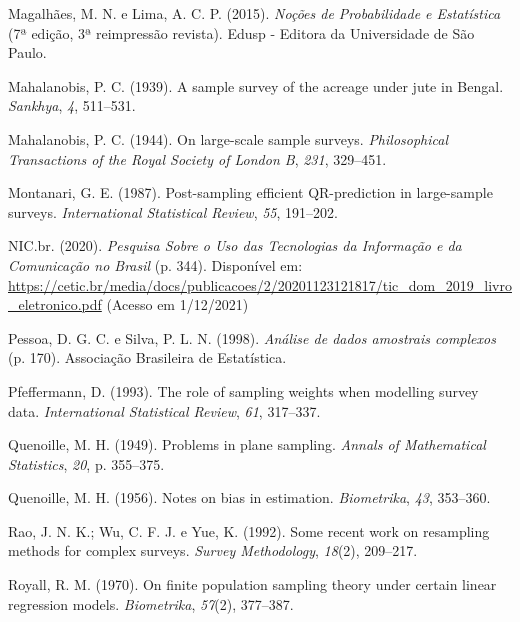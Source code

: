 \documentclass[
  12pt,
  brazilian,
]{book}
\newlength{\cslhangindent}
\newlength{\cslentryspacingunit} %
\newenvironment{CSLReferences}[2] %
 {%
  \setlength{\parindent}{0pt}
  \ifodd #1
  \let\oldpar\par
  \def\par{\hangindent=\cslhangindent\oldpar}
  \fi
  \setlength{\parskip}{#2\cslentryspacingunit}
 }%
 {}
\theoremstyle{definition}
\theoremstyle{definition}
\theoremstyle{definition}
\theoremstyle{definition}
\theoremstyle{remark}
\begin{document}
\begin{CSLReferences}{1}{0}
\leavevmode{}%
Magalhães, M. N. e Lima, A. C. P. (2015). \emph{Noções de Probabilidade e Estatística} (7ª edição, 3ª reimpressão revista). Edusp - Editora da Universidade de São Paulo.

\leavevmode{}%
Mahalanobis, P. C. (1939). A sample survey of the acreage under jute in Bengal. \emph{Sankhya}, \emph{4}, 511--531.

\leavevmode{}%
Mahalanobis, P. C. (1944). On large-scale sample surveys. \emph{Philosophical Transactions of the Royal Society of London B}, \emph{231}, 329--451.

\leavevmode{}%
Montanari, G. E. (1987). Post-sampling efficient {QR-prediction} in large-sample surveys. \emph{International Statistical Review}, \emph{55}, 191--202.

\leavevmode{}%
NIC.br. (2020). \emph{{Pesquisa Sobre o Uso das Tecnologias da Informa{ç}{ã}o e da Comunica{ç}{ã}o no Brasil}} (p. 344). Disponível em: \url{https://cetic.br/media/docs/publicacoes/2/20201123121817/tic_dom_2019_livro_eletronico.pdf} (Acesso em 1/12/2021)

\leavevmode{}%
Pessoa, D. G. C. e Silva, P. L. N. (1998). \emph{{An{á}lise de dados amostrais complexos}} (p. 170). Associa{ç}{ã}o Brasileira de Estat{í}stica.

\leavevmode{}%
Pfeffermann, D. (1993). The role of sampling weights when modelling survey data. \emph{International Statistical Review}, \emph{61}, 317--337.

\leavevmode{}%
Quenoille, M. H. (1949). Problems in plane sampling. \emph{Annals of Mathematical Statistics}, \emph{20}, p. 355--375.

\leavevmode{}%
Quenoille, M. H. (1956). Notes on bias in estimation. \emph{Biometrika}, \emph{43}, 353--360.

\leavevmode{}%
Rao, J. N. K.; Wu, C. F. J. e Yue, K. (1992). {Some recent work on resampling methods for complex surveys}. \emph{Survey Methodology}, \emph{18}(2), 209--217.

\leavevmode{}%
Royall, R. M. (1970). On finite population sampling theory under certain linear regression models. \emph{Biometrika}, \emph{57}(2), 377--387.


\end{CSLReferences}
\end{document}

